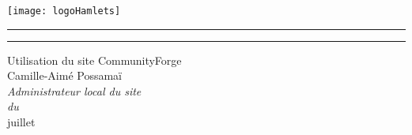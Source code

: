 \thispagestyle{empty}
\pagecolor[rgb]{0.08,0.3,0.25}\afterpage{\pagecolor[rgb]{.95,.94,.86}}%
\vspace*{-3cm}
\texttt{[image: logoHamlets]}

\vspace{10mm}

\enlargethispage{3cm}
\begin{minipage}{20pt}
    \newcommand{\hcouv}{.95\textheight}
    \rule{.3pt}{0pt}\hspace{-.5pt}
    \rule{.2pt}{0pt}\hspace{-.5pt}
\end{minipage}
\begin{minipage}{.98\linewidth}  
    \vspace*{20mm}
    \begin{flushright}
     \textsf{\huge\color[rgb]{.98,.77,.05}\fontsize{28}{28}\selectfont Utilisation du site CommunityForge}\\[20mm]
     {\Large\color[rgb]{.98,.77,.05} Camille-Aimé {\sc Possamaï}}\\[2mm]
     \textsl{\color[rgb]{.98,.77,.05}Administrateur local du site\\ du \CdS}\\
     \vspace{123mm}
     {\Large\color[rgb]{.98,.77,.05} juillet }
    \end{flushright}    
    \vfill\null
\end{minipage}


\newpage\ \thispagestyle{empty}\newpage
